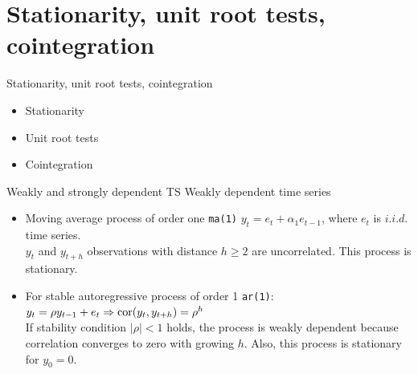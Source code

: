 \documentclass{beamer}
\begin{document}
\section{Stationarity, unit root tests, cointegration}
\begin{frame}{Stationarity, unit root tests, cointegration}
  \begin{itemize}
      \item Stationarity
      \bigskip
      \item Unit root tests
      \bigskip
      \item Cointegration
  \end{itemize}  
\end{frame}
\begin{frame}{Weakly and strongly dependent TS}
Weakly dependent time series
  \vspace{0.4cm}
\begin{itemize}
  \item Moving average process of order one \texttt{ma(1)} $y_t=e_t+\alpha_1 e_{t-1}$, where $e_t$ is $\textit{i.i.d.}$ time series. \\$y_t$ and $y_{t+h}$ observations with distance $h \geq 2$ are uncorrelated. This process is stationary.
  \vspace{0.7cm}
  \item For stable autoregressive process of order 1 \texttt{ar(1)}: \\ \smallskip
  $y_t = \rho y_{t-1} + e_t \Rightarrow \textnormal{cor}(y_t,y_{t+h})=\rho^h$\\
  \vspace{0.4cm}
  If stability condition $|\rho|<1$  holds, the process is weakly dependent because correlation converges to zero with growing $h$. Also, this process is stationary for $y_0 =0$.
  \vspace{0.4cm}
\end{itemize}
\end{frame}
\end{document}
